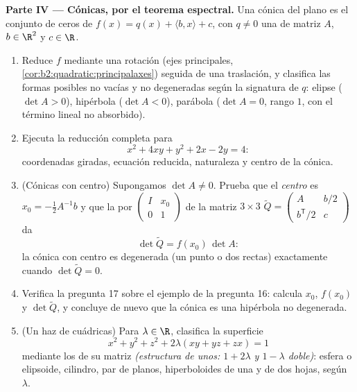\begin{problem}
\medskip
\noindent\textbf{Parte IV --- Cónicas, por el teorema espectral.}
Una cónica del plano es el conjunto de ceros de $f(x) = q(x) +
\langle b, x\rangle + c$, con $q \neq 0$ una  de
matriz $A$, $b \in \R^2$ y $c \in \R$.
\begin{enumerate}[resume]
  \item Reduce $f$ mediante una rotación (ejes principales,
        \cref{cor:b2:quadratic:principalaxes}) seguida de una
        traslación, y clasifica las formas posibles no vacías y no
        degeneradas según la signatura de $q$: elipse ($\det A >
        0$), hipérbola ($\det A < 0$), parábola ($\det A = 0$, rango
        $1$, con el término lineal no absorbido).
  \item Ejecuta la reducción completa para
        \[
        x^2 + 4xy + y^2 + 2x - 2y = 4 :
        \]
        coordenadas giradas, ecuación reducida, naturaleza y centro
        de la cónica.
  \item (Cónicas con centro) Supongamos $\det A \neq 0$. Prueba que
        el \emph{centro} es $x_0 = -\frac12 A^{-1}b$ y que la
         por $\begin{pmatrix} I & x_0\\ 0 &
        1\end{pmatrix}$ de la matriz $3\times3$ $\widetilde Q =
        \begin{pmatrix} A & b/2 \\ b^{\mathsf T}/2 &
        c\end{pmatrix}$ da
        \[
        \det\widetilde Q = f(x_0)\,\det A :
        \]
        la cónica con centro es degenerada (un punto o dos rectas)
        exactamente cuando $\det\widetilde Q = 0$.
  \item Verifica la pregunta 17 sobre el ejemplo de la pregunta 16:
        calcula $x_0$, $f(x_0)$ y $\det\widetilde Q$, y concluye de
        nuevo que la cónica es una hipérbola no degenerada.
  \item (Un haz de cuádricas) Para $\lambda \in \R$, clasifica la
        superficie
        \[
        x^2 + y^2 + z^2 + 2\lambda(xy + yz + zx) = 1
        \]
        mediante los  de su matriz \emph{(estructura
        de unos:  $1 + 2\lambda$ y $1 - \lambda$
        doble)}: esfera o elipsoide, cilindro, par de planos,
        hiperboloides de una y de dos hojas, según $\lambda$.
\end{enumerate}


\end{problem}
